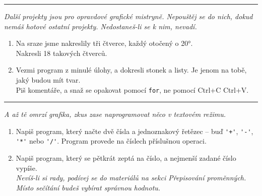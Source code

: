 \documentclass[a4paper,10pt]{article}
\newcommand\startsection[1]{
     \vspace{0.2ex}
    \hrule
    {\fontspec{Oxygen} \tiny
     \vspace{-1ex}
     \emph{#1}
     \vspace{-1.5em}
    }
}
\begin{document}
\startsection{Další projekty jsou pro opravdové grafické mistryně. Nepouštěj se do nich, dokud nemáš hotové ostatní projekty.
Nedostaneš-li se k nim, nevadí.}

\begin{enumerate}[resume]
\item Na sraze jsme nakreslily tři čtverce, každý otočený o 20°.
    \\Nakresli 18 takových čtverců.

\item Vezmi program z minulé úlohy, a dokresli stonek a listy.
    Je jenom na tobě, jaký budou mít tvar.
    \\Piš komentáře, a snaž se opakovat pomocí \verb+for+,
        ne pomocí Ctrl+C Ctrl+V.

\end{enumerate}

\startsection{A až tě omrzí grafika, zkus zase naprogramovat něco v textovém režimu.}

\begin{enumerate}[resume]
\item Napiš program, který načte dvě čísla a jednoznakový řetězec
    – buď \verb!'+'!, \verb!'-'!, \verb!'*'! nebo \verb!'/'!.
    Program provede na číslech příslušnou operaci.

\item Napiš program, který se pětkrát zeptá na číslo, a nejmenší zadané číslo vypíše.
    \\\emph{\small Nevíš-li si rady, podívej se do materiálů na sekci Přepisování proměnných.
            Místo sečítání budeš vybírat správnou hodnotu.}

\end{enumerate}
\end{document}
